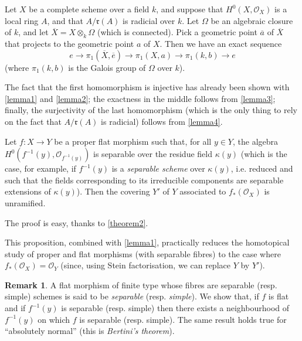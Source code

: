 \documentclass{article}
\theoremstyle{plain}
\newenvironment{proposition}[1]
  {\renewcommand\theinnercustomproposition{#1}\innercustomproposition}
  {\endinnercustomproposition}
\newenvironment{lemma}[1]
  {\renewcommand\theinnercustomlemma{#1}\innercustomlemma}
  {\endinnercustomlemma}
\theoremstyle{definition}
\newtheorem*{remark}{Remark}
\newcommand{\sh}[1]{{\mathscr{#1}}}
\newcommand{\fk}{\mathfrak}
\newcommand{\kres}{\kappa}
\newcommand{\oldpage}[1]{\marginpar{\footnotesize$\Big\vert$ \textit{p.~#1}}}
\begin{document}
\begin{lemma}{5}
\label{lemma5}
  Let $X$ be a complete scheme over a field $k$, and suppose that $H^0(X,\sh{O}_X)$ is a local ring $A$, and that $A/\fk{r}(A)$ is radicial over $k$.
  Let $\Omega$ be an algebraic closure of $k$, and let $\overline{X}=X\otimes_k\Omega$ (which is connected).
  Pick a geometric point $\overline{a}$ of $\overline{X}$ that projects to the geometric point $a$ of $X$.
  Then we have an exact sequence
  \[
    e
    \to \pi_1(\overline{X},\overline{e})
    \to \pi_1(X,a)
    \to \pi_1(k,b)
    \to e
  \]
  (where $\pi_1(k,b)$ is the Galois group of $\Omega$ over $k$).
\end{lemma}

The fact that the first homomorphism is injective has already been shown with \cref{lemma1} and \cref{lemma2};
the exactness in the middle follows from \cref{lemma3};
finally, the surjectivity of the last homomorphism (which is the only thing to rely on the fact that $A/\fk{r}(A)$ is radicial) follows from \cref{lemma4}.

\begin{proposition}{4}
\label{proposition4}
  Let $f\colon X\to Y$ be a proper flat morphism such that, for all $y\in Y$, the algebra $H^0(f^{-1}(y),\sh{O}_{f^{-1}(y)})$ is separable over the residue field $\kres(y)$ (which is the case, for example, if $f^{-1}(y)$ is a \emph{separable scheme} over $\kres(y)$, i.e. reduced and such that the fields corresponding to its irreducible components are separable extensions of $\kres(y)$).
  Then the covering
\oldpage{182-21}
  $Y'$ of $Y$ associated to $f_*(\sh{O}_X)$ is unramified.
\end{proposition}

The proof is easy, thanks to \cref{theorem2}.

This proposition, combined with \cref{lemma1}, practically reduces the homotopical study of proper and flat morphisms (with separable fibres) to the case where $f_*(\sh{O}_X)=\sh{O}_Y$ (since, using Stein factorisation, we can replace $Y$ by $Y'$).

\begin{remark}
  A flat morphism of finite type whose fibres are separable (resp. simple) schemes is said to be \emph{separable} (resp. \emph{simple}).
  We show that, if $f$ is flat and if $f^{-1}(y)$ is separable (resp. simple) then there exists a neighbourhood of $f^{-1}(y)$ on which $f$ is separable (resp. simple).
  The same result holds true for ``absolutely normal'' (this is \emph{Bertini's theorem}).
\end{remark}
\end{document}

